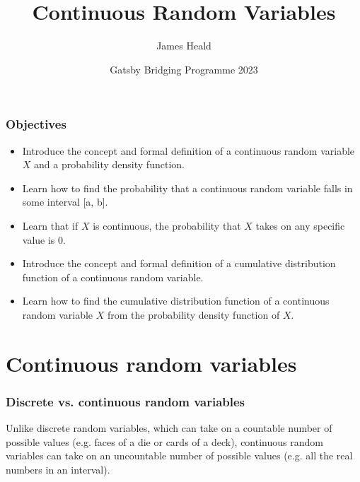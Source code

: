\documentclass[10pt]{beamer}
\title[Continuous Random Variables ]
{Continuous Random Variables\newline }
\subtitle{}
\author[James Heald] %
{James Heald\inst{1}}
\institute[UCL] %
{
  \inst{1}%
  Gatsby Computational Neuroscience Unit\\
  University College London
}
\date[Gatsby Bridging Programme  2023] %
{Gatsby Bridging Programme 2023}
\begin{document}
\frame{\titlepage}



\begin{frame}
\frametitle{Objectives}
\begin{itemize}
    \item Introduce the concept and formal definition of a continuous random variable $X$ and a probability density function.
        \item Learn how to find the probability that a continuous random variable falls in some interval [a, b].
    \item Learn that if $X$ is continuous, the probability that $X$ takes on any specific value is 0.
    \item Introduce the concept and formal definition of a cumulative distribution function of a continuous random variable.
    \item Learn how to find the cumulative distribution function of a continuous random variable $X$ from the probability density function of $X$.
\end{itemize}
\end{frame}

\section{Continuous random variables}
\begin{frame}
\frametitle{Discrete vs. continuous random variables}

Unlike discrete random variables, which can take on a countable number of possible values (e.g. faces of a die or cards of a deck), continuous random variables can take on an uncountable number of possible values (e.g. all the real numbers in an interval).

\


\end{frame}
\end{document}
